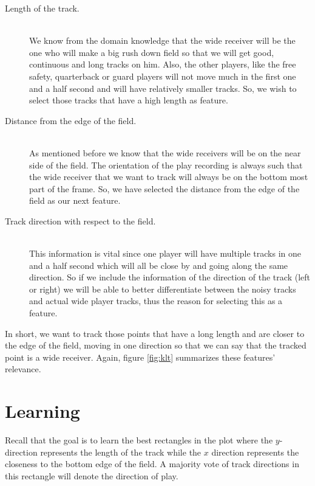 \documentclass{article} %
\begin{document}
\begin{description}
	\item[Length of the track.] \hfill \\
	We know from the domain knowledge that the wide receiver will be the one who will make a big rush down field so that we will get good, continuous and long tracks on him. Also, the other players, like the free safety, quarterback or guard players will not move much in the first one and a half second and will have relatively smaller tracks. So, we wish to select those tracks that have a high length as feature.
	
	\item[Distance from the edge of the field.] \hfill \\
	As mentioned before we know that the wide receivers will be on the near side of the field. The orientation of the play recording is always such that the wide receiver that we want to track will always be on the bottom most part of the frame. So, we have selected the distance from the edge of the field as our next feature. 
	
	\item[Track direction with respect to the field.] \hfill \\
	This information is vital since one player will have multiple tracks in one and a half second which will all be close by and going along the same direction. So if we include the information of the direction of the track (left or right) we will be able to better differentiate between the noisy tracks and actual wide player tracks, thus the reason for selecting this as a feature.
	
\end{description}

In short, we want to track those points that have a long length and are closer to the edge of the field, moving in one direction so that we can say that the tracked point is a wide receiver. Again, figure \ref{fig:klt} summarizes these features' relevance.

\section{Learning}

Recall that the goal is to learn the best rectangles in the plot where the $y$-direction represents the length of the track while the $x$ direction represents the closeness to the bottom edge of the field. A majority vote of track directions in this rectangle will denote the direction of play.
\end{document}
